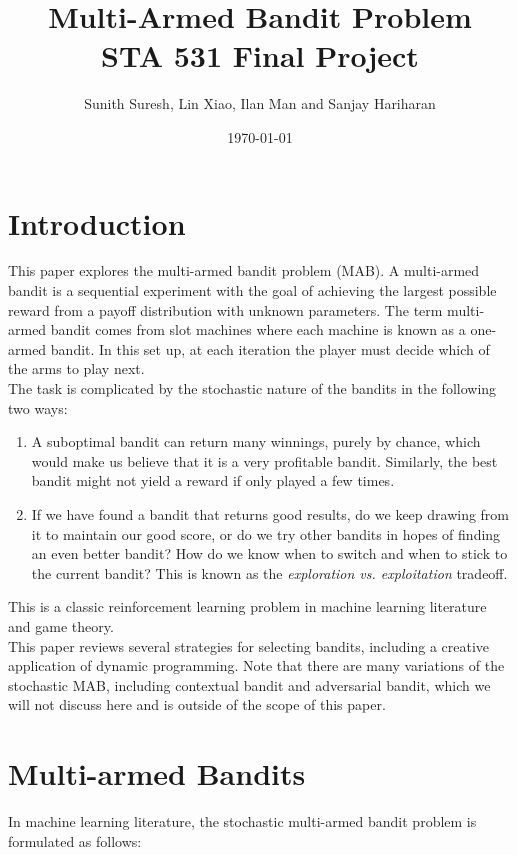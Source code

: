 \documentclass{article}
\title{Multi-Armed Bandit Problem\\
STA 531 Final Project}
\author{Sunith Suresh, Lin Xiao, Ilan Man and Sanjay Hariharan}
\date{\today}
\begin{document}
\maketitle

\section{Introduction}

This paper explores the multi-armed bandit problem (MAB). A multi-armed bandit is a sequential experiment with the goal of achieving the largest possible reward from a payoff distribution with unknown parameters. The term multi-armed bandit comes from slot machines where each machine is known as a one-armed bandit. In this set up, at each iteration the player must decide which of the arms to play next.\\

The task is complicated by the stochastic nature of the bandits in the following two ways:

\begin{enumerate}
\item A suboptimal bandit can return many winnings, purely by chance, which would make us believe that it is a very profitable bandit. Similarly, the best bandit might not yield a reward if only played a few times.
\item If we have found a bandit that returns good results, do we keep drawing from it to maintain our good score, or do we try other bandits in hopes of finding an even better bandit? How do we know when to switch and when to stick to the current bandit? This is known as the \textit{exploration vs. exploitation} tradeoff.
\end{enumerate}

This is a classic reinforcement learning problem in machine learning literature and game theory.\\

This paper reviews several strategies for selecting bandits, including a creative application of dynamic programming. Note that there are many variations of the stochastic MAB, including contextual bandit and adversarial bandit, which we will not discuss here and is outside of the scope of this paper. 

\section{Multi-armed Bandits}

In machine learning literature, the stochastic multi-armed bandit problem is formulated as follows:
\end{document}
